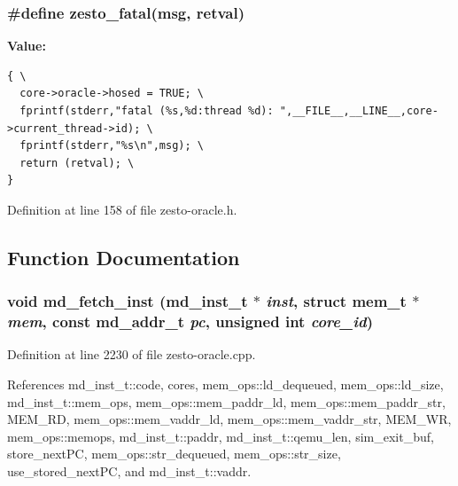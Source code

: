 \subsubsection[{zesto\_\-fatal}]{\setlength{\rightskip}{0pt plus 5cm}\#define zesto\_\-fatal(msg, \/  retval)}\label{zesto-oracle_8h_a62f33e5d3102234e8f957f4722f5f51}


\textbf{Value:}

\begin{Code}\begin{verbatim}{ \
  core->oracle->hosed = TRUE; \
  fprintf(stderr,"fatal (%s,%d:thread %d): ",__FILE__,__LINE__,core->current_thread->id); \
  fprintf(stderr,"%s\n",msg); \
  return (retval); \
}
\end{verbatim}
\end{Code}


Definition at line 158 of file zesto-oracle.h.

\subsection{Function Documentation}
\subsubsection[{md\_\-fetch\_\-inst}]{\setlength{\rightskip}{0pt plus 5cm}void md\_\-fetch\_\-inst ({\bf md\_\-inst\_\-t} $\ast$ {\em inst}, \/  struct {\bf mem\_\-t} $\ast$ {\em mem}, \/  const {\bf md\_\-addr\_\-t} {\em pc}, \/  unsigned int {\em core\_\-id})}\label{zesto-oracle_8h_c9b36de1d166dbea41697884bd42aa7e}




Definition at line 2230 of file zesto-oracle.cpp.

References md\_\-inst\_\-t::code, cores, mem\_\-ops::ld\_\-dequeued, mem\_\-ops::ld\_\-size, md\_\-inst\_\-t::mem\_\-ops, mem\_\-ops::mem\_\-paddr\_\-ld, mem\_\-ops::mem\_\-paddr\_\-str, MEM\_\-RD, mem\_\-ops::mem\_\-vaddr\_\-ld, mem\_\-ops::mem\_\-vaddr\_\-str, MEM\_\-WR, mem\_\-ops::memops, md\_\-inst\_\-t::paddr, md\_\-inst\_\-t::qemu\_\-len, sim\_\-exit\_\-buf, store\_\-nextPC, mem\_\-ops::str\_\-dequeued, mem\_\-ops::str\_\-size, use\_\-stored\_\-nextPC, and md\_\-inst\_\-t::vaddr.

